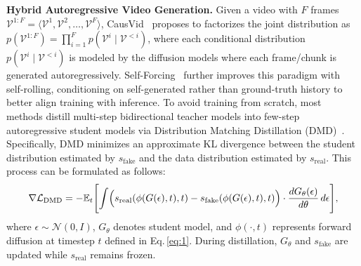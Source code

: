 \noindent
\textbf{Hybrid Autoregressive Video Generation.}
% 
Given a video with $F$ frames $\mathcal{V}^{1:F} = \langle \mathcal{V}^1, \mathcal{V}^2, \ldots, \mathcal{V}^F \rangle$, CausVid~\cite{yin2025slow} proposes to factorizes the joint distribution as $p(\mathcal{V}^{1:F}) = \prod_{i=1}^{F} p(\mathcal{V}^{i} \mid \mathcal{V}^{<i})$, where each conditional distribution $p(\mathcal{V}^{i} \mid \mathcal{V}^{<i})$ is modeled by the diffusion models where each frame/chunk is generated autoregressively.
% 
Self-Forcing~\cite{huang2025self} further improves this paradigm with self-rolling, conditioning on self-generated rather than ground-truth history to better align training with inference.
% 
To avoid training from scratch, most methods distill multi-step bidirectional teacher models into few-step autoregressive student models via Distribution Matching Distillation (DMD)~\cite{yin2024improved}.
% 
Specifically, DMD minimizes an approximate KL divergence between the student distribution estimated by $s_{\text{fake}}$ and the data distribution estimated by $s_{\text{real}}$. This process can be formulated as follows:
% 
\begin{equation}
\nabla \mathcal{L}_{\text{DMD}} = - \mathbb{E}_{t} \Biggl[ 
    \int \Bigl( 
        s_{\text{real}}(\phi(G(\epsilon), t), t) - s_{\text{fake}}(\phi(G(\epsilon), t), t) 
    \Bigr) \cdot \frac{d G_{\theta}(\epsilon)}{d\theta} \, d\epsilon
\Biggr],
\label{eq:3}
\end{equation}
% 
where $\epsilon \sim  \mathcal{N}(0, I)$, $G_{\theta}$ denotes student model, and $\phi(\cdot,t)$ represents forward diffusion at timestep $t$ defined in Eq.\,\ref{eq:1}.
During distillation, $G_{\theta}$ and $s_{\text{fake}}$ are updated while $s_{\text{real}}$ remains frozen.
